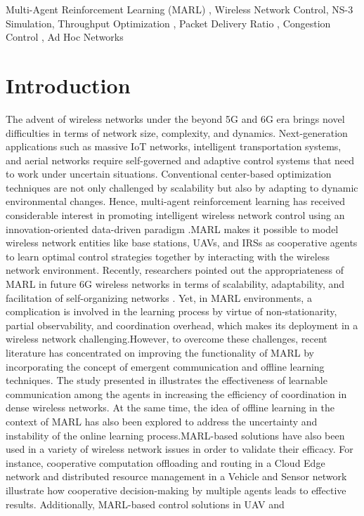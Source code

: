 \documentclass[a4paper,fleqn]{cas-dc}
\numberwithin{equation}{section}
\begin{document}
\begin{keywords}
Multi-Agent Reinforcement Learning (MARL) \sep 
Wireless Network Control\sep 
NS-3 Simulation\sep 
Throughput Optimization \sep
Packet Delivery Ratio \sep 
Congestion Control \sep
Ad Hoc Networks
\end{keywords}




\maketitle



\section{Introduction}
The advent of wireless networks under the beyond 5G and 6G era brings novel difficulties in terms of network size, complexity, and dynamics. Next-generation applications such as massive IoT networks, intelligent transportation systems, and aerial networks require self-governed and adaptive control systems that need to work under uncertain situations. Conventional center-based optimization techniques are not only challenged by scalability but also by adapting to dynamic environmental changes. Hence, multi-agent reinforcement learning  has received considerable interest in promoting intelligent wireless network control using an innovation-oriented data-driven paradigm \cite{chafii2023emergent}\cite{zhang2025multi}.MARL makes it possible to model wireless network entities like base stations, UAVs, and IRSs as cooperative agents to learn optimal control strategies together by interacting with the wireless network environment. Recently, researchers pointed out the appropriateness of MARL in future 6G wireless networks in terms of scalability, adaptability, and facilitation of self-organizing networks \cite{zhang2025multi}\cite{eldeeb2026offline}. Yet, in MARL environments, a complication is involved in the learning process by virtue of non-stationarity, partial observability, and coordination overhead, which makes its deployment in a wireless network challenging.However, to overcome these challenges, recent literature has concentrated on improving the functionality of MARL by incorporating the concept of emergent communication and offline learning techniques. The study presented in \cite{chafii2023emergent} illustrates the effectiveness of learnable communication among the agents in increasing the efficiency of coordination in dense wireless networks. At the same time, the idea of offline learning in the context of MARL has also been explored \cite{li2026puzzle}\cite{eldeeb2026offline} to address the uncertainty and instability of the online learning process.MARL-based solutions have also been used in a variety of wireless network issues in order to validate their efficacy. For instance, cooperative computation offloading and routing in a Cloud Edge network \cite{suzuki2023multi} and distributed resource management in a Vehicle and Sensor network \cite{zhao2023multi} illustrate how cooperative decision-making by multiple agents leads to effective results. Additionally, MARL-based control solutions in UAV and 
\end{document}
